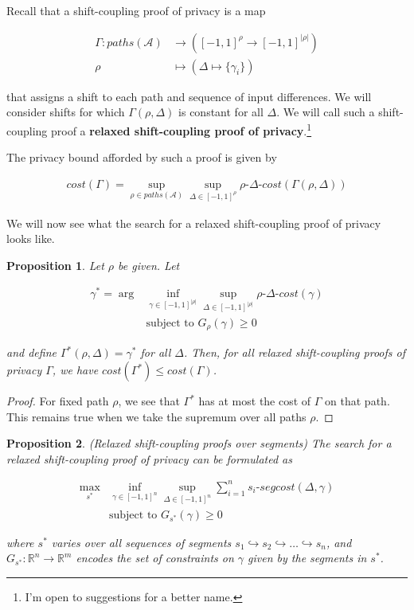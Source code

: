 \documentclass{article}
\newcommand{\R}{\mathbb{R}}
\newtheorem{proposition}{Proposition}[section]
\newcommand{\1}{\langle 1 \rangle}
\newcommand{\2}{\langle 2 \rangle}
\begin{document}
Recall that a shift-coupling proof of privacy is a map 

\begin{align*}
    \Gamma: paths(\mathcal{A}) &\to ([-1, 1]^{\rho} \to [-1, 1]^{|\rho|})\\
    \rho &\mapsto (\Delta \mapsto \{\gamma_i\})
\end{align*}

that assigns a shift to each path and sequence of input differences. We will consider shifts for which $\Gamma(\rho, \Delta)$ is constant for all $\Delta$. We will call such a shift-coupling proof a \textbf{relaxed shift-coupling proof of privacy}.\footnote{I'm open to suggestions for a better name.}

The privacy bound afforded by such a proof is given by

\begin{align*}
    cost(\Gamma) = \sup_{\rho \in paths(\mathcal{A})} \sup_{\Delta \in [-1, 1]^{\rho}} \rho\text{-}\Delta\text{-}cost(\Gamma(\rho, \Delta))
\end{align*}

We will now see what the search for a relaxed shift-coupling proof of privacy looks like.

\begin{proposition}
    \label{prop:relaxed_shifts}
    Let $\rho$ be given. Let 

    \begin{align*}
        \gamma^* = \arg &\inf_{\gamma \in [-1, 1]^{|\rho|}} \sup_{\Delta \in [-1, 1]^{|\rho|}} \rho\text{-}\Delta\text{-}cost( \gamma)\\
        &\text{subject to } G_{\rho}(\gamma) \geq 0
    \end{align*}

    and define $\Gamma^*(\rho, \Delta) = \gamma^*$ for all $\Delta$. Then, for all relaxed shift-coupling proofs of privacy $\Gamma$, we have $cost(\Gamma^*) \leq cost(\Gamma)$.
\end{proposition}

\begin{proof}
    For fixed path $\rho$, we see that $\Gamma^*$ has at most the cost of $\Gamma$ on that path. This remains true when we take the supremum over all paths $\rho$.
\end{proof}

\begin{proposition}
    (Relaxed shift-coupling proofs over segments) The search for a relaxed shift-coupling proof of privacy can be formulated as

    \begin{align*}
        \max_{s^*} &\inf_{\gamma \in [-1, 1]^n} \sup_{\Delta \in [-1, 1]^{n}}\sum_{i = 1}^n s_i\text{-}segcost(\Delta, \gamma) \\ 
        &\text{subject to } G_{s^*}(\gamma) \geq 0
    \end{align*}

    where $s^*$ varies over all sequences of segments $s_1 \hookrightarrow s_2 \hookrightarrow \dots \hookrightarrow s_n$, and $G_{s^*} : \R^n \to \R^m$ encodes the set of constraints on $\gamma$ given by the segments in $s^*$. 
\end{proposition}
\end{document}
